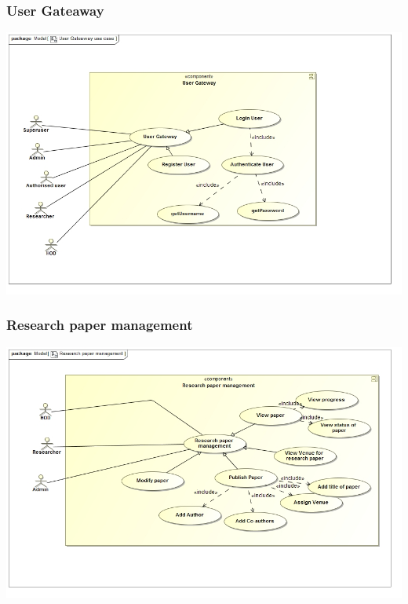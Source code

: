 \documentclass[11pt]{article}
\begin{document}
	\subsubsection{User Gateaway}
	\begin{center}
		\includegraphics[width=\textwidth]{../Images/UserGateawayUC.jpg}\\[0.5cm]
	\end{center}
	\subsubsection{Research paper management}
	\begin{center}
		\includegraphics[width=\textwidth]{../Images/ResearchpapermanagementUC.jpg}\\[0.5cm]
	\end{center}
\end{document}
